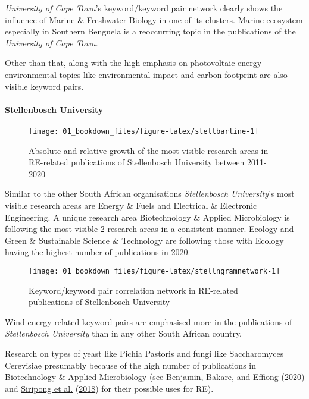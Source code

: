 \documentclass[12pt,twoside]{report}
\let\oldparagraph\paragraph
\renewcommand{\paragraph}[1]{\oldparagraph{#1}\mbox{}}
\begin{document}
\emph{University of Cape Town}'s keyword/keyword pair network clearly shows the influence of Marine \& Freshwater Biology in one of its clusters. Marine ecosystem especially in Southern Benguela is a reoccurring topic in the publications of the \emph{University of Cape Town}.

Other than that, along with the high emphasis on photovoltaic energy environmental topics like environmental impact and carbon footprint are also visible keyword pairs.

\hypertarget{stellenbosch-university}{%
\paragraph{Stellenbosch University}\label{stellenbosch-university}}

\begin{figure}
\texttt{[image: 01\_bookdown\_files/figure-latex/stellbarline-1]} \caption{Absolute and relative growth of the most visible research areas in RE-related publications of Stellenbosch University between 2011-2020}\label{fig:stellbarline}
\end{figure}

Similar to the other South African organisations \emph{Stellenbosch University}'s most visible research areas are Energy \& Fuels and Electrical \& Electronic Engineering. A unique research area Biotechnology \& Applied Microbiology is following the most visible 2 research areas in a consistent manner. Ecology and Green \& Sustainable Science \& Technology are following those with Ecology having the highest number of publications in 2020.

\begin{figure}
\texttt{[image: 01\_bookdown\_files/figure-latex/stellngramnetwork-1]} \caption{Keyword/keyword pair correlation network in RE-related publications of Stellenbosch University }\label{fig:stellngramnetwork}
\end{figure}

Wind energy-related keyword pairs are emphasised more in the publications of \emph{Stellenbosch University} than in any other South African country.

Research on types of yeast like Pichia Pastoris and fungi like Saccharomyces Cerevisiae presumably because of the high number of publications in Biotechnology \& Applied Microbiology (see \protect\hyperlink{ref-benjamin2020}{Benjamin, Bakare, and Effiong} (\protect\hyperlink{ref-benjamin2020}{2020}) and \protect\hyperlink{ref-siripong2018}{Siripong et al.} (\protect\hyperlink{ref-siripong2018}{2018}) for their possible uses for RE).
\end{document}
